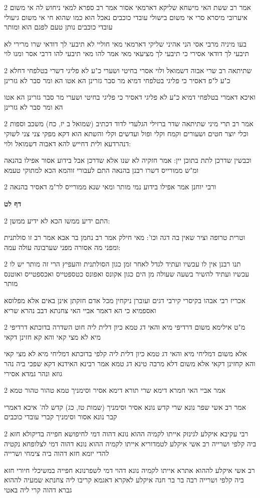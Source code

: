 \documentclass[12pt, openany]{book}
\newcommand{\sethebfont}{
\fontsize{10.5pt}{21.0pt} \selectfont
}
\newcommand{\twocol}[1]{
	{\sethebfont \begin{multicols}{2}
			#1
	\end{multicols}}	
}
\newcommand{\sectname}{}
\newcommand{\newsection}[1]{
	\addcontentsline{toc}{section}{#1}
	\renewcommand{\sectname}{#1}	
	\vspace{-\baselineskip}
	\begin{center}
		\textbf{%
\fontsize{16pt}{16pt}\selectfont
			#1}
	\end{center}
	\vspace{-\baselineskip}
	\nopagebreak
}
\begin{document}
\twocol{אמר רב ששת האי מישחא שליקא דארמאי אסור אמר רב ספרא למאי ניחוש לה אי משום איערובי מיסרא סרי אי משום בישולי עובדי כוכבים נאכל הוא כמו שהוא חי אי משום גיעולי עובדי כוכבים נותן טעם לפגם הוא ומותר
\par בעו מיניה מרבי אסי הני אהיני שליקי דארמאי מאי חוליי לא תיבעי לך דודאי שרו מרירי לא תיבעי לך דודאי אסירי כי תיבעי לך מציעאי מאי אמר להו מאי תיבעי להו דרבי אסר ומנו לוי}
\twocol{שתיתאה רב שרי אבוה דשמואל ולוי אסרי בחיטי ושערי כ"ע לא פליגי דשרי בטלפחי דחלא כ"ע ל"פ דאסיר כי פליגי בטלפחי דמיא מר סבר גזרינן הא אטו הא ומר סבר לא גזרינן
\par ואיכא דאמרי בטלפחי דמיא כ"ע לא פליגי דאסיר כי פליגי בחיטי ושערי מר סבר גזרינן הא אטו הא ומר סבר לא גזרינן}
\twocol{אמר רב תרי מיני שתיתאה שדר ברזילי הגלעדי לדוד דכתיב (שמואל ב יז, כח) משכב וספות וכלי יוצר חטים ושעורים וקמח וקלי ופול ועדשים וקלי והשתא הוא דקא מפקי צני צני לשוקי דנהרדעא ולית דחייש להא דאבוה דשמואל ולוי:
\par וכבשין שדרכן לתת בתוכן יין: אמר חזקיה לא שנו אלא שדרכן אבל בידוע אסור אפילו בהנאה ומ"ש ממורייס דשרו רבנן בהנאה התם לעבורי זוהמא הכא למתוקי טעמא}
\twocol{ורבי יוחנן אמר אפילו בידוע נמי מותר ומאי שנא ממורייס לר"מ דאסיר בהנאה}
\newsection{דף לט}
\twocol{התם ידיע ממשו הכא לא ידיע ממשן:
\par וטרית טרופה וציר שאין בה דגה וכו': מאי חילק אמר רב נחמן בר אבא אמר רב זו סולתנית ומפני מה אסורה מפני שערבונה עולה עמה:}
\twocol{תנו רבנן אין לו עכשיו ועתיד לגדל לאחר זמן כגון הסולתנית והעפיץ הרי זה מותר יש לו עכשיו ועתיד להשיר בשעה שעולה מן הים כגון אקונס ואפונס כטספטייס ואכספטייס ואוטנס מותר
\par אכריז רבי אבהו בקיסרי קירבי דגים ועוברן ניקחין מכל אדם חזקתן אינן באים אלא מפלוסא ואספמיא כי הא דאמר אביי האי צחנתא דבב נהרא שריא}
\twocol{מ"ט אילימא משום דרדיפי מיא והאי דג טמא כיון דלית ליה חוט השדרה בדוכתא דרדיפי מיא לא מצי קאי והא קא חזינן דקאי
\par אלא משום דמליחי מיא והאי דג טמא כיון דלית ליה קלפי בדוכתא דמליחי מיא לא מצי קאי והא קחזינן דקאי אלא משום דלא מרבה טינא דג טמא אמר רבינא האידנא דקא שפכי ביה נהר גוזא ונהר גמדא אסירי}
\twocol{אמר אביי האי חמרא דימא שרי תורא דימא אסיר וסימניך טמא טהור טהור טמא
\par אמר רב אשי שפר נונא שרי קדש נונא אסיר וסימניך (שמות טז, כג) קדש לה' איכא דאמרי קבר נונא אסור וסימניך קברי עובדי כוכבים}
\twocol{רבי עקיבא איקלע לגינזק אייתו לקמיה ההוא נונא דהוה דמי לחיפושא חפייה בדיקולא חזא ביה קלפי ושרייה רב אשי איקלע לטמדוריא אייתו לקמיה ההוא נונא דהוה דמי לצלופחא נקטיה להדי יומא חזא דהוה ביה צימחי ושרייה
\par רב אשי איקלע לההוא אתרא אייתו לקמיה נונא דהוי דמי לשפרנונא חפייה במשיכלי חיורי חזא ביה קלפי ושרייה רבה בר בר חנה איקלע לאקרא דאגמא קריבו ליה צחנתא שמעיה לההוא גברא דהוה קרי ליה באטי}
\end{document}
